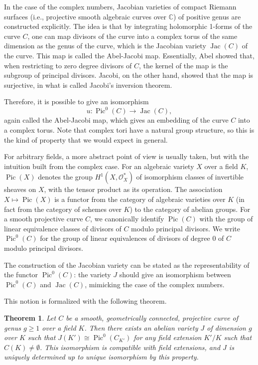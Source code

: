 \documentclass[a4paper, 12pt]{amsart}
\theoremstyle{definition}
\theoremstyle{plain}
\theoremstyle{plain}
\newtheorem{thm0}[defn0]{Theorem}
\theoremstyle{plain}
\theoremstyle{plain}
\theoremstyle{remark}
\theoremstyle{remark}
\theoremstyle{plain}
\newenvironment{theorem}{ \begin{thm0}}{\end{thm0}}
\DeclareMathOperator{\Pic}{Pic}
\DeclareMathOperator{\Jac}{Jac}
\begin{document}
	In the case of the complex numbers, Jacobian varieties of compact Riemann surfaces (i.e., projective smooth algebraic curves over $\mathbb{C}$) of positive genus are constructed explicitly. The idea is that by integrating holomorphic 1-forms of the curve $C$, one can map divisors of the curve into a complex torus of the same dimension as the genus of the curve, which is the Jacobian variety $\Jac(C)$ of the curve. This map is called the Abel-Jacobi map. Essentially, Abel showed that, when restricting to zero degree divisors of $C$, the kernel of the map is the subgroup of principal divisors. Jacobi, on the other hand, showed that the map is surjective, in what is called Jacobi's inversion theorem.
	
	Therefore, it is possible to give an isomorphism
	\begin{equation*}
		u:\Pic^0(C)\rightarrow \Jac(C),
	\end{equation*}
	again called the Abel-Jacobi map, which gives an embedding of the curve $C$ into a complex torus. Note that complex tori have a natural group structure, so this is the kind of property that we would expect in general.
	
	For arbitrary fields, a more abstract point of view is usually taken, but with the intuition built from the complex case. For an algebraic variety $X$ over a field $K$, $\Pic(X)$ denotes the group $H^1(X,\mathcal{O}_X^*)$ of isomorphism classes of invertible sheaves on $X$, with the tensor product as its operation. The association $X\mapsto\Pic(X)$ is a functor from the category of algebraic varieties over $K$ (in fact from the category of schemes over $K$) to the category of abelian groups. For a smooth projective curve $C$, we canonically identify $\Pic(C)$ with the group of linear equivalence classes of divisors of $C$ modulo principal divisors. We write $\Pic^0(C)$ for the group of linear equivalences of divisors of degree 0 of $C$ modulo principal divisors.
	
	The construction of the Jacobian variety can be stated as the representability of the functor $\Pic^0(C)$: the variety $J$ should give an isomorphism between $\Pic^0(C)$ and $\Jac(C)$, mimicking the case of the complex numbers.
	
	This notion is formalized with the following theorem.
	\begin{theorem}
		Let $C$ be a smooth, geometrically connected, projective curve of genus $g\ge 1$ over a field $K$. Then there exists an abelian variety $J$ of dimension $g$ over $K$ such that $J(K')\cong\Pic^0(C_{K'})$ for any field extension $K'/K$ such that $C(K)\neq \emptyset$. This isomorphism is compatible with field extensions, and $J$ is uniquely determined up to unique isomorphism by this property.
	\end{theorem}
	
\end{document}

